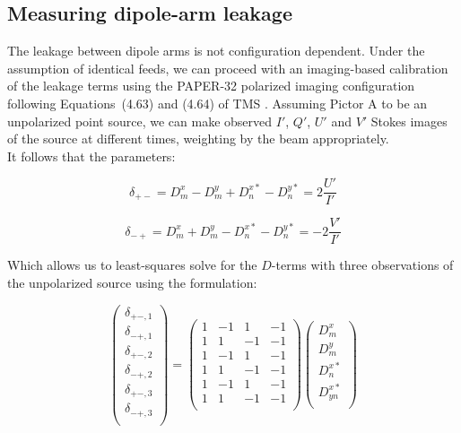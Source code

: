 \documentclass[10pt,a4paper,notitlepage]{article}
\begin{document}
\subsection{Measuring dipole-arm leakage}
\label{subsec:method_dterms}
The leakage between dipole arms is not configuration dependent. Under the assumption of identical feeds, we can proceed with an imaging-based calibration of the leakage terms using the PAPER-32 polarized imaging configuration following Equations~(4.63) and (4.64) of TMS \cite{TMS}. Assuming Pictor A to be an unpolarized point source, we can make observed $I'$, $Q'$, $U'$ and $V'$ Stokes images of the source at different times, weighting by the beam appropriately.  \\

It follows that the parameters:

\begin{equation}
\delta_{+-} = D^x_m - D^y_m + D^{x*}_n - D^{y*}_n = 2\frac{U'}{I'}
\end{equation}

\begin{equation}
\delta_{-+} = D^x_m + D^y_m - D^{x*}_n - D^{y*}_n = -2\frac{V'}{I'}
\end{equation}

\noindent Which allows us to least-squares solve for the $D$-terms with three observations of the unpolarized source using the formulation:

\begin{equation}
\begin{pmatrix}
\delta_{+-,1} \\
\delta_{-+,1} \\
\delta_{+-,2} \\
\delta_{-+,2} \\
\delta_{+-,3} \\
\delta_{-+,3} \\
\end{pmatrix}
=
\begin{pmatrix}
1 & -1 & 1 & -1 \\
1 & 1 & -1 & -1 \\
1 & -1 & 1 & -1 \\
1 & 1 & -1 & -1 \\
1 & -1 & 1 & -1 \\
1 & 1 & -1 & -1 \\
\end{pmatrix}
\begin{pmatrix}
D^x_{m}\\
D^y_{m}\\
D^{x*}_{n}\\
D^{x*}_{yn}\\
\end{pmatrix}
\end{equation}
\end{document}
